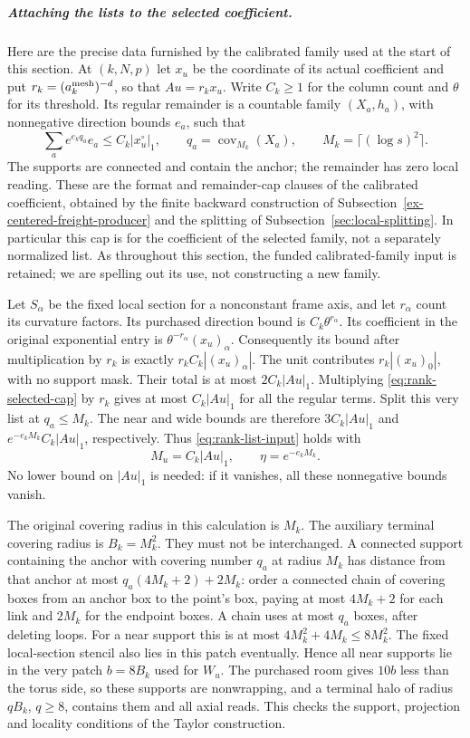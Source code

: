 \subparagraph{Attaching the lists to the selected coefficient.}
Here are the precise data furnished by the calibrated family used at the
start of this section. At $(k,N,p)$ let $x_u$ be the coordinate of its
actual coefficient and put $r_k=(a_k^{\rm mesh})^{-d}$, so that
$Au=r_kx_u$. Write $C_k\ge1$ for the column count and $\theta$ for
its threshold. Its regular remainder is a countable family
$(X_a,h_a)$, with nonnegative direction bounds $e_a$, such that
\begin{equation}\label{eq:rank-selected-cap}
 \sum_a e^{e_k q_a}e_a\le C_k|x_u^\circ|_1,
 \qquad q_a=\operatorname{cov}_{M_k}(X_a),
 \qquad M_k=\lceil(\log s)^2\rceil.
\end{equation}
The supports are connected and contain the anchor; the remainder has
zero local reading. These are the format and remainder-cap clauses of
the calibrated coefficient, obtained by the finite backward construction
of Subsection~\ref{ex-centered-freight-producer} and the splitting of
Subsection~\ref{sec:local-splitting}. In particular this cap is for the
coefficient of the selected family, not a separately normalized list.
As throughout this section, the funded calibrated-family input is retained;
we are spelling out its use, not constructing a new family.

Let $S_\alpha$ be the fixed local section for a nonconstant frame axis,
and let $r_\alpha$ count its curvature factors. Its purchased direction
bound is $C_k\theta^{r_\alpha}$. Its coefficient in the original
exponential entry is $\theta^{-r_\alpha}(x_u)_\alpha$.
Consequently its bound after multiplication by $r_k$ is exactly
$r_k C_k|(x_u)_\alpha|$. The unit contributes $r_k|(x_u)_0|$,
with no support mask. Their total is at most $2C_k|Au|_1$.
Multiplying \eqref{eq:rank-selected-cap} by $r_k$ gives at most
$C_k|Au|_1$ for all the regular terms. Split this very list at
$q_a\le M_k$. The near and wide bounds are therefore
$3C_k|Au|_1$ and $e^{-e_kM_k}C_k|Au|_1$, respectively.
Thus \eqref{eq:rank-list-input} holds with
\[
 M_u=C_k|Au|_1,\qquad \eta=e^{-e_kM_k}.
\]
No lower bound on $|Au|_1$ is needed: if it vanishes, all these
nonnegative bounds vanish.

The original covering radius in this calculation is $M_k$. The
auxiliary terminal covering radius is $B_k=M_k^2$. They must not be
interchanged. A connected support containing the anchor with covering
number $q_a$ at radius $M_k$ has distance from that anchor at most
$q_a(4M_k+2)+2M_k$: order a connected chain of covering boxes from
an anchor box to the point's box, paying at most $4M_k+2$ for each
link and $2M_k$ for the endpoint boxes. A chain uses at most $q_a$
boxes, after deleting loops. For a near support this is at most
$4M_k^2+4M_k\le8M_k^2$. The fixed local-section stencil also lies
in this patch eventually. Hence all near supports lie in the very
patch $b=8B_k$ used for $W_u$. The purchased room gives $10b$ less
than the torus side, so these supports are nonwrapping, and a
terminal halo of radius $qB_k$, $q\ge8$, contains them and all
axial reads. This checks the support, projection and locality
conditions of the Taylor construction.

